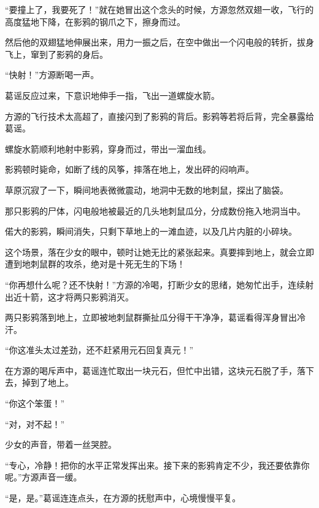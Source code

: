 \begin{this_body}
“要撞上了，我要死了！”就在她冒出这个念头的时候，方源忽然双翅一收，飞行的高度猛地下降，在影鸦的钢爪之下，擦身而过。

然后他的双翅猛地伸展出来，用力一振之后，在空中做出一个闪电般的转折，拔身飞上，窜到了影鸦的身后。

“快射！”方源断喝一声。

葛谣反应过来，下意识地伸手一指，飞出一道螺旋水箭。

方源的飞行技术太高超了，直接闪到了影鸦的背后。影鸦等若将后背，完全暴露给葛谣。

螺旋水箭顺利地射中影鸦，穿身而过，带出一溜血线。

影鸦顿时毙命，如断了线的风筝，摔落在地上，发出砰的闷响声。

草原沉寂了一下，瞬间地表微微震动，地洞中无数的地刺鼠，探出了脑袋。

那只影鸦的尸体，闪电般地被最近的几头地刺鼠瓜分，分成数份拖入地洞当中。

偌大的影鸦，瞬间消失，只剩下草地上的一滩血迹，以及几片内脏的小碎块。

这个场景，落在少女的眼中，顿时让她无比的紧张起来。真要摔到地上，就会立即遭到地刺鼠群的攻杀，绝对是十死无生的下场！

“你再想什么呢？还不快射！”方源的冷喝，打断少女的思绪，她匆忙出手，连续射出近十箭，这才将两只影鸦消灭。

两只影鸦落到地上，立即被地刺鼠群撕扯瓜分得干干净净，葛谣看得浑身冒出冷汗。

“你这准头太过差劲，还不赶紧用元石回复真元！”

在方源的喝斥声中，葛谣连忙取出一块元石，但忙中出错，这块元石脱了手，落下去，掉到了地上。

“你这个笨蛋！”

“对，对不起！”

少女的声音，带着一丝哭腔。

“专心，冷静！把你的水平正常发挥出来。接下来的影鸦肯定不少，我还要依靠你呢。”方源声音一缓。

“是，是。”葛谣连连点头，在方源的抚慰声中，心境慢慢平复。

\end{this_body}

